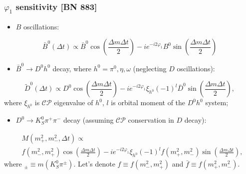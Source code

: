 \documentclass[10 pt,compress,mathserif]{beamer}
\newcommand{\cpconj}{\ensuremath{\mathcal{CP}}\xspace}
\newcommand{\dkspp}{\ensuremath{D^0\to K_S^0\pi^+\pi^-}\xspace}
\begin{document}
\begin{frame}
 \frametitle{$\varphi_1$ sensitivity [BN 883]}
 \begin{small}
 \begin{itemize}
  \item $B$ oscillations:
 \end{itemize}
 \begin{equation}
  \bar B^0\left(\Delta t\right) \propto \bar B^0\cos\left(\frac{\Delta m\Delta t}{2}\right)-ie^{-i2\varphi_1}B^0\sin\left(\frac{\Delta m\Delta t}{2}\right)
 \end{equation}
  \begin{itemize}
  \item $\bar B^0\to D^0h^0$ decay, where $h^0 = \pi^0,\eta,\omega$ (neglecting $D$ oscillations):
 \end{itemize}
 \begin{equation}
  \widetilde{D}^0\left(\Delta t\right) \propto D^0\cos\left(\frac{\Delta m\Delta t}{2}\right)-ie^{-i2\varphi_1}\xi_{h^0}(-1)^l\bar D^0\sin\left(\frac{\Delta m\Delta t}{2}\right),
 \end{equation}
  where $\xi_{h^0}$ is \cpconj eigenvalue of $h^0$, $l$ is orbital moment of the $D^0h^0$ system;
 \begin{itemize}
  \item \dkspp decay (assuming \cpconj conservation in $D$ decay):
 \end{itemize}
 \begin{equation}
 \begin{split}
  &M\left(m_+^2,m_-^2,\Delta t\right) \propto\\
  &f\left(m_-^2,m_+^2\right)\cos\left(\frac{\Delta m\Delta t}{2}\right)-ie^{-i2\varphi_1}\xi_{h^0}(-1)^l f\left(m_+^2,m_-^2\right)\sin\left(\frac{\Delta m\Delta t}{2}\right),
 \end{split}
 \end{equation}
 where $_{\pm} \equiv m\left(K_S^0\pi^{\pm}\right)$. Let's denote $f \equiv f\left(m_-^2,m_+^2\right)$ and $\bar f \equiv f\left(m_+^2,m_-^2\right)$.
 \end{small}
\end{frame}
\end{document}
